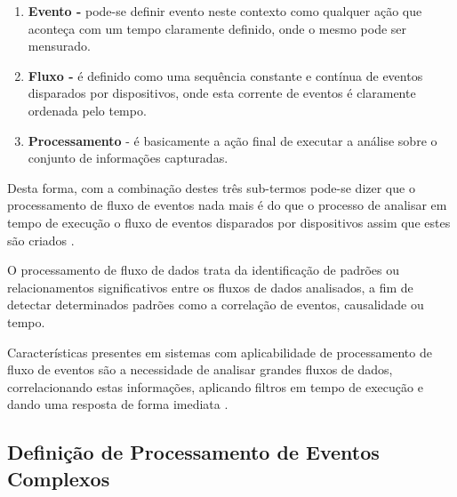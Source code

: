 \documentclass[ti,table]{texufpel} %
\begin{document}
\begin{enumerate} 

    \item  \textbf{Evento -} pode-se definir evento neste contexto como qualquer ação que aconteça com um tempo claramente definido, onde o mesmo pode ser mensurado.   

     

    \item  \textbf{Fluxo -} é definido como uma sequência constante e contínua de eventos disparados por dispositivos, onde esta corrente de eventos é claramente ordenada pelo tempo. 

     

    \item  \textbf{Processamento} - é basicamente a ação final de executar a análise sobre o conjunto de informações capturadas. 

\end{enumerate} 

Desta forma, com a combinação destes três sub-termos pode-se dizer que o processamento de fluxo de eventos nada mais é do que o processo de analisar em tempo de execução o fluxo de eventos disparados por dispositivos assim que estes são criados \cite{dayarathna2018recent}.  

  

O processamento de fluxo de dados trata da identificação de padrões ou relacionamentos significativos entre os fluxos de dados analisados, a fim de detectar determinados padrões como a correlação de eventos, causalidade ou tempo. 

Características presentes em sistemas com aplicabilidade de processamento de fluxo de eventos são a necessidade de analisar grandes fluxos de dados, correlacionando estas informações, aplicando filtros em tempo de execução e dando uma resposta de forma imediata \cite{appel2013event}. 

  

  


  

\subsection{Definição de Processamento de Eventos Complexos} 
\end{document}
